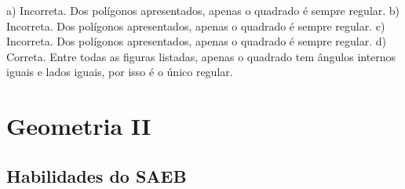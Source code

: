 \begin{escolha}
\begin{boxmedio}
\begin{boxmedio}
{\begin{boxpeq}
\begin{boxpeq}
{\begin{boxpeq}
\begin{boxmedio}
\begin{boxmedio}
\begin{boxpeq}
\begin{boxmedio}
\begin{boxpeq}
\begin{boxpeq}
\begin{boxpeq}
\begin{boxpeq}
\begin{boxmedio}
{\begin{boxmedio}
\begin{boxmedio}
\begin{boxpeq}
\begin{boxmedio}
\begin{boxpeq}
\begin{boxpeq}
\begin{boxpeq}
\begin{escolha}
{\begin{boxmedio}
\begin{boxpeq}
\begin{boxpeq}
\begin{boxpeq}
\begin{boxpeq}
\begin{boxpeq}
\begin{boxmedio}
\begin{boxpeq}
\begin{boxpeq}
\begin{boxpeq}
{\begin{boxpeq}
\begin{boxmedio}
\begin{boxpeq}
\begin{boxpeq}
\begin{boxpeq}
{\begin{boxpeq}
\begin{boxmedio}
{\begin{boxpeq}
\begin{boxpeq}
\begin{boxmedio}
\begin{boxmedio}
\begin{boxpeq}
\begin{boxpeq}
{\begin{boxpeq}
\begin{boxpeq}
\begin{boxpeq}
\begin{boxpeq}
\begin{boxpeq}
\begin{escolha}
\begin{escolha}
{a) Incorreta. Dos polígonos apresentados, apenas o quadrado é sempre regular. 
b) Incorreta. Dos polígonos apresentados, apenas o quadrado é sempre regular. 
c) Incorreta. Dos polígonos apresentados, apenas o quadrado é sempre regular. 
d) Correta. Entre todas as figuras listadas, apenas o quadrado tem ângulos
internos iguais e lados iguais, por isso é o único regular.}

\chapter{Geometria II}

\section{Habilidades do SAEB}

\begin{itemize}


\end{itemize}
\end{escolha}
\end{escolha}
\end{boxpeq}
\end{boxpeq}
\end{boxpeq}
\end{boxpeq}
\end{boxpeq}}
\end{boxpeq}
\end{boxpeq}
\end{boxmedio}
\end{boxmedio}
\end{boxpeq}
\end{boxpeq}}
\end{boxmedio}
\end{boxpeq}}
\end{boxpeq}
\end{boxpeq}
\end{boxpeq}
\end{boxmedio}
\end{boxpeq}}
\end{boxpeq}
\end{boxpeq}
\end{boxpeq}
\end{boxmedio}
\end{boxpeq}
\end{boxpeq}
\end{boxpeq}
\end{boxpeq}
\end{boxpeq}
\end{boxmedio}}
\end{escolha}
\end{boxpeq}
\end{boxpeq}
\end{boxpeq}
\end{boxmedio}
\end{boxpeq}
\end{boxmedio}
\end{boxmedio}}
\end{boxmedio}
\end{boxpeq}
\end{boxpeq}
\end{boxpeq}
\end{boxpeq}
\end{boxmedio}
\end{boxpeq}
\end{boxmedio}
\end{boxmedio}
\end{boxpeq}}
\end{boxpeq}
\end{boxpeq}}
\end{boxmedio}
\end{boxmedio}
\end{escolha}
